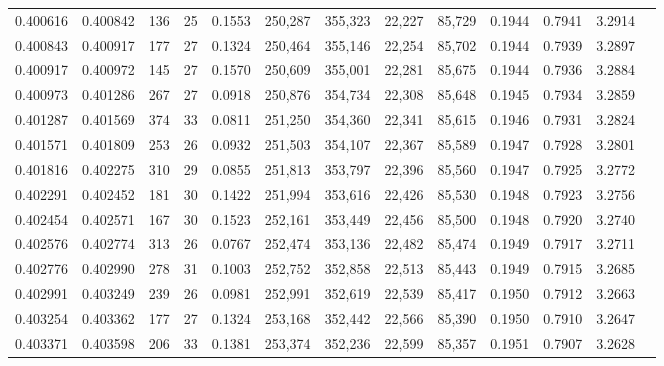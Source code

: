 \begin{tabular}{rrrrrrrrrrrrr}
0.400616 & 0.400842 &   136 &  25 &                                     0.1553 & 250,287 & 355,323 &  22,227 &  85,729 & 0.1944 & 0.7941 & 3.2914 \\
0.400843 & 0.400917 &   177 &  27 &                                     0.1324 & 250,464 & 355,146 &  22,254 &  85,702 & 0.1944 & 0.7939 & 3.2897 \\
0.400917 & 0.400972 &   145 &  27 &                                     0.1570 & 250,609 & 355,001 &  22,281 &  85,675 & 0.1944 & 0.7936 & 3.2884 \\
0.400973 & 0.401286 &   267 &  27 &                                     0.0918 & 250,876 & 354,734 &  22,308 &  85,648 & 0.1945 & 0.7934 & 3.2859 \\
0.401287 & 0.401569 &   374 &  33 &                                     0.0811 & 251,250 & 354,360 &  22,341 &  85,615 & 0.1946 & 0.7931 & 3.2824 \\
0.401571 & 0.401809 &   253 &  26 &                                     0.0932 & 251,503 & 354,107 &  22,367 &  85,589 & 0.1947 & 0.7928 & 3.2801 \\
0.401816 & 0.402275 &   310 &  29 &                                     0.0855 & 251,813 & 353,797 &  22,396 &  85,560 & 0.1947 & 0.7925 & 3.2772 \\
0.402291 & 0.402452 &   181 &  30 &                                     0.1422 & 251,994 & 353,616 &  22,426 &  85,530 & 0.1948 & 0.7923 & 3.2756 \\
0.402454 & 0.402571 &   167 &  30 &                                     0.1523 & 252,161 & 353,449 &  22,456 &  85,500 & 0.1948 & 0.7920 & 3.2740 \\
0.402576 & 0.402774 &   313 &  26 &                                     0.0767 & 252,474 & 353,136 &  22,482 &  85,474 & 0.1949 & 0.7917 & 3.2711 \\
0.402776 & 0.402990 &   278 &  31 &                                     0.1003 & 252,752 & 352,858 &  22,513 &  85,443 & 0.1949 & 0.7915 & 3.2685 \\
0.402991 & 0.403249 &   239 &  26 &                                     0.0981 & 252,991 & 352,619 &  22,539 &  85,417 & 0.1950 & 0.7912 & 3.2663 \\
0.403254 & 0.403362 &   177 &  27 &                                     0.1324 & 253,168 & 352,442 &  22,566 &  85,390 & 0.1950 & 0.7910 & 3.2647 \\
0.403371 & 0.403598 &   206 &  33 &                                     0.1381 & 253,374 & 352,236 &  22,599 &  85,357 & 0.1951 & 0.7907 & 3.2628 \\

\end{tabular}
